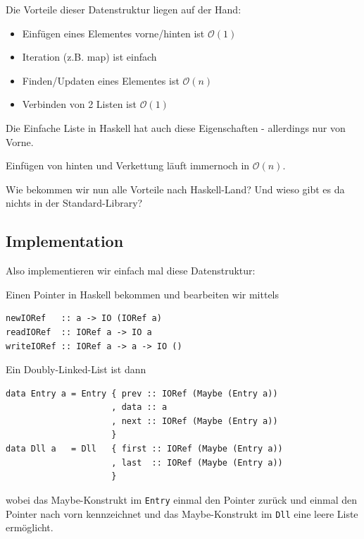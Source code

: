 \documentclass{beamer}
\begin{document}
\begin{frame}
Die Vorteile dieser Datenstruktur liegen auf der Hand:
\pause
\begin{itemize}
 \item Einfügen eines Elementes vorne/hinten ist $\mathcal{O}(1)$
 \pause
 \item Iteration (z.B. map) ist einfach
 \pause
 \item Finden/Updaten eines Elementes ist $\mathcal{O}(n)$
 \pause
 \item Verbinden von 2 Listen ist $\mathcal{O}(1)$
\end{itemize}
\pause

Die Einfache Liste in Haskell hat auch diese Eigenschaften - allerdings nur von Vorne.\\\par\pause
Einfügen von hinten und Verkettung läuft immernoch in $\mathcal{O}(n)$.\\\par\pause\smallskip
Wie bekommen wir nun alle Vorteile nach Haskell-Land? Und wieso gibt es da nichts in der Standard-Library?

\end{frame}

\subsection{Implementation}

\begin{frame}[fragile]
Also implementieren wir einfach mal diese Datenstruktur:\\\pause\par
Einen Pointer in Haskell bekommen und bearbeiten wir mittels
\begin{verbatim}
newIORef   :: a -> IO (IORef a)
readIORef  :: IORef a -> IO a
writeIORef :: IORef a -> a -> IO ()
\end{verbatim}
\pause
Ein Doubly-Linked-List ist dann
\begin{verbatim}
data Entry a = Entry { prev :: IORef (Maybe (Entry a))
                     , data :: a
                     , next :: IORef (Maybe (Entry a))
                     }
data Dll a   = Dll   { first :: IORef (Maybe (Entry a))
                     , last  :: IORef (Maybe (Entry a))
                     }
\end{verbatim}
\pause
wobei das Maybe-Konstrukt im \texttt{Entry} einmal den Pointer zurück und einmal den Pointer nach vorn kennzeichnet und das Maybe-Konstrukt im \texttt{Dll} eine leere Liste ermöglicht.
\end{frame}
\end{document}
